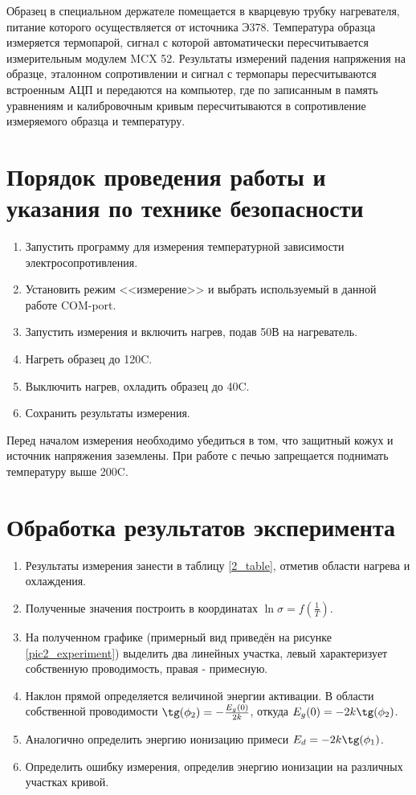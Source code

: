 Образец в специальном держателе помещается в кварцевую трубку нагревателя, питание которого осуществляется от источника Э378. Температура образца измеряется термопарой, сигнал с которой автоматически пересчитывается измерительным модулем MCX 52. Результаты измерений падения напряжения на образце, эталонном сопротивлении и сигнал с термопары пересчитываются встроенным АЦП и передаются на компьютер, где по записанным в память уравнениям и калибровочным кривым пересчитываются в сопротивление измеряемого образца и температуру.

\section{Порядок проведения работы и указания по технике безопасности}

\begin{enumerate}
\item Запустить программу для измерения температурной зависимости электросопротивления.
\item Установить режим <<измерение>> и выбрать используемый в данной работе COM-port.
\item Запустить измерения и включить нагрев, подав 50В на нагреватель.
\item Нагреть образец до 120\textdegree C.
\item Выключить нагрев, охладить образец до 40\textdegree C.
\item Сохранить результаты измерения.
\end{enumerate}

Перед началом измерения необходимо убедиться в том, что защитный кожух и источник напряжения заземлены. При работе с печью запрещается поднимать температуру выше 200\textdegree C.

\section{Обработка результатов эксперимента}

\begin{enumerate}
\item Результаты измерения занести в таблицу \ref{2_table}, отметив области нагрева и охлаждения.
\item Полученные значения построить в координатах $\ln \sigma = f \left( \frac{1}{T} \right)$.
\item На полученном графике (примерный вид приведён на рисунке \ref{pic2_experiment}) выделить два линейных участка, левый характеризует собственную проводимость, правая - примесную.
\item Наклон прямой определяется величиной энергии активации. В области собственной проводимости $\tg (\phi_{2}) = -\frac{E_{g}(0)}{2 k}$, откуда $E_{g}(0) = -2 k \tg(\phi_{2})$.
\item Аналогично определить энергию ионизацию примеси $E_{d} = -2 k \tg(\phi_{1})$.\
\item Определить ошибку измерения, определив энергию ионизации на различных участках кривой.
\end{enumerate}


